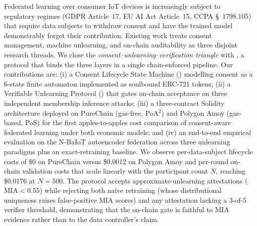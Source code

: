 Federated learning over consumer IoT devices is increasingly subject to
regulatory regimes (GDPR Article~17, EU AI Act Article~15, CCPA
\S~1798.105) that require data subjects to withdraw consent and have
the trained model demonstrably forget their contribution. Existing work
treats consent management, machine unlearning, and on-chain auditability
as three disjoint research threads. We close the
\emph{consent--unlearning--verification triangle} with \sysname, a
protocol that binds the three layers in a single chain-enforced
pipeline. Our contributions are: (i) a Consent Lifecycle State Machine
(\clsm) modelling consent as a 6-state finite automaton implemented as
soulbound ERC-721 tokens; (ii) a Verifiable Unlearning Protocol (\vup)
that gates on-chain acceptance on three independent membership
inference attacks; (iii) a three-contract Solidity architecture
deployed on PureChain (gas-free, PoA$^2$) and Polygon Amoy (gas-based,
PoS) for the first apples-to-apples cost comparison of consent-aware
federated learning under both economic models; and (iv) an end-to-end
empirical evaluation on the N-BaIoT autoencoder federation across
three unlearning paradigms plus an exact-retraining baseline. We
observe per-data-subject lifecycle costs of $\$0$ on PureChain versus
\$0.0012 on Polygon Amoy and per-round on-chain validation costs that
scale linearly with the participant count $N$, reaching \$0.0176 at
$N=500$. The protocol accepts approximate-unlearning attestations
($\text{MIA}\!<\!0.55$) while rejecting both naive
retraining (whose distributional uniqueness raises false-positive MIA
scores) and any attestation lacking a 3-of-5 verifier threshold,
demonstrating that the on-chain gate is faithful to MIA evidence rather
than to the data controller's claim.

